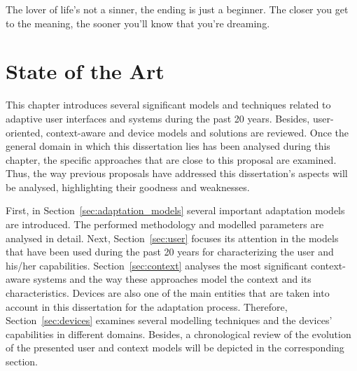 

\begin{savequote}[50mm]
The lover of life's not a sinner, the ending is just a beginner.
The closer you get to the meaning, the sooner you'll know that you're dreaming.
%
\end{savequote}


\chapter{State of the Art}
\label{cha:state_of_the_art}

\ifpdf
    \graphicspath{{2_state_of_the_art/figures/PNG/}{2_state_of_the_art/figures/PDF/}{2_state_of_the_art/figures/}}
\else
    \graphicspath{{2_state_of_the_art/figures/EPS/}{2_state_of_the_art/figures/}}
\fi


This chapter introduces several significant models and techniques related to 
adaptive user interfaces and systems during the past 20 years. Besides, user-oriented,
context-aware and device models and solutions are reviewed. Once the general
domain in which this dissertation lies has been analysed during this chapter,
the specific approaches that are close to this proposal are examined. Thus, 
the way previous proposals have addressed this dissertation's aspects will be 
analysed, highlighting their goodness and weaknesses.  

First, in Section~\ref{sec:adaptation_models} several important adaptation models
are introduced. The performed methodology and modelled parameters are analysed in
detail. Next, Section~\ref{sec:user} focuses its attention in the models
that have been used during the past 20 years for characterizing the user and his/her
capabilities. Section~\ref{sec:context} analyses the most significant
context-aware systems and the way these approaches model the context and its
characteristics. Devices are also one of the main entities that are taken into
account in this dissertation for the adaptation process. Therefore, Section~\ref{sec:devices}
examines several modelling techniques and the devices' capabilities in different
domains. Besides, a chronological review of the evolution of the presented user 
and context models will be depicted in the corresponding section.






